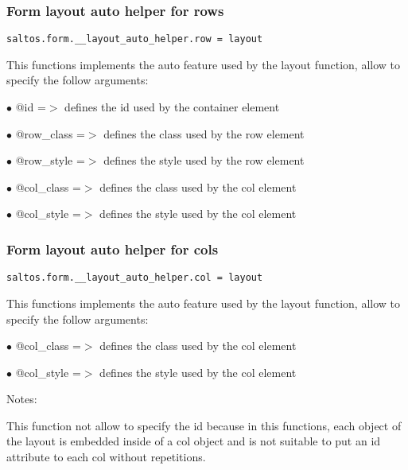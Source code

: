 \documentclass[a4paper]{article}
\begin{document}
\hypertarget{toc782}{}
\subsubsection{Form layout auto helper for rows}

\begin{lstlisting}
saltos.form.__layout_auto_helper.row = layout
\end{lstlisting}

This functions implements the auto feature used by the layout function, allow to specify the
follow arguments:

\begin{compactitem}
\item[\color{myblue}$\bullet$] @id              =$>$ defines the id used by the container element
\item[\color{myblue}$\bullet$] @row\_class       =$>$ defines the class used by the row element
\item[\color{myblue}$\bullet$] @row\_style       =$>$ defines the style used by the row element
\item[\color{myblue}$\bullet$] @col\_class       =$>$ defines the class used by the col element
\item[\color{myblue}$\bullet$] @col\_style       =$>$ defines the style used by the col element
\end{compactitem}

\hypertarget{toc783}{}
\subsubsection{Form layout auto helper for cols}

\begin{lstlisting}
saltos.form.__layout_auto_helper.col = layout
\end{lstlisting}

This functions implements the auto feature used by the layout function, allow to specify the
follow arguments:

\begin{compactitem}
\item[\color{myblue}$\bullet$] @col\_class       =$>$ defines the class used by the col element
\item[\color{myblue}$\bullet$] @col\_style       =$>$ defines the style used by the col element
\end{compactitem}

Notes:

This function not allow to specify the id because in this functions, each object of the
layout is embedded inside of a col object and is not suitable to put an id attribute
to each col without repetitions.
\end{document}
